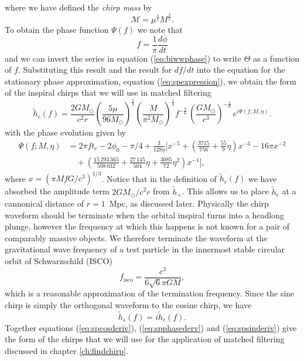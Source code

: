 where we have defined the \emph{chirp mass} by
\begin{equation}
\mathcal{M} = \mu^\frac{3}{5} M^\frac{2}{5}.
\end{equation}
To obtain the phase function $\Psi(f)$ we note that
\begin{equation}
f = \frac{1}{\pi} \frac{d\phi}{dt}
\end{equation}
and we can invert the series in equation (\ref{eq:biwwphase}) to write
$\Theta$ as a function of $f$. Substituting this result and the result for
$df/dt$ into the equation for the stationary phase approximation, equation
(\ref{eq:spexpression}), we obtain the form of the inspiral chirps that we
will use in matched filtering
\begin{equation}
\label{eq:spcosderiv}
\tilde{h}_c(f)=\frac{2GM_\odot}{c^2 r}
\left(\frac{5\mu}{96M_\odot}\right)^\frac{1}{2}
\left(\frac{M}{\pi^2M_\odot}\right)^\frac{1}{3}
f^{-\frac{7}{6}}\, \left( \frac{GM_\odot}{c^3} \right)^{-\frac{1}{6}}\,
e^{i\Psi(f;M,\eta)}.
\end{equation}
with the phase evolution given by
\begin{equation}
\begin{split}
\Psi(f;M,\eta) &= 2\pi ft_c-2\phi_0-\pi/4+\frac{3}{128\eta}\biggl[x^{-5}+
\left(\frac{3715}{756}+\frac{55}{9}\eta\right)x^{-3}
-16\pi x^{-2} \\
&\quad +\left(\frac{15\,293\,365}{508\,032}+\frac{27\,145}{504}\eta
+\frac{3085}{72}\eta^2\right)x^{-1}\biggr],
\label{eq:spphasederv}
\end{split}
\end{equation}
where $x=(\pi M f G/c^3)^{1/3}$. Notice that in the definition of
$\tilde{h}_c(f)$ we have absorbed the amplitude term $2GM_\odot/c^2 r$ from
$\tilde{h}_{+}$. This allows us to place $\tilde{h}_c$ at a cannonical
distance of $r = 1$~Mpc, as discussed later. Physically the chirp waveform
should be terminate when the orbital inspiral turns into a headlong plunge,
however the frequency at which this happens is not known for a pair of
comparably massive objects. We therefore terminate the waveform at the
gravitational wave frequency of a test particle in the innermost stable
circular orbit of Schwarzschild (ISCO)\cite{Wald:1984}
\begin{equation}
f_\mathrm{isco} = \frac{c^3}{6\sqrt{6}\pi GM},
\end{equation}
which is a reasonable approximation of the termination
frequency\cite{Droz:1999qx}. Since the sine chirp is simply the orthogonal
waveform to the cosine chirp, we have
\begin{equation}
\tilde{h}_s(f)=i\tilde{h}_c(f).
\label{eq:spsinderiv}
\end{equation}
Together equations (\ref{eq:spcosderiv}), (\ref{eq:spphasederv}) and
(\ref{eq:spsinderiv}) give the form of the chirps that we will use for the
application of matched filtering discussed in chapter \ref{ch:findchirp}.

